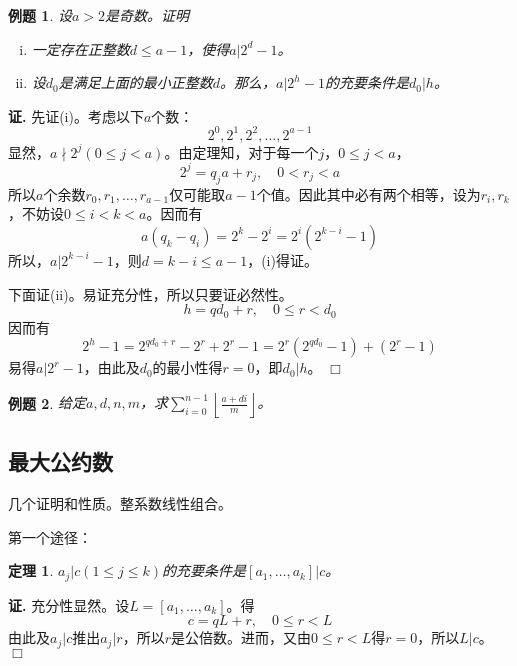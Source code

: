 \documentclass{ctexart}
\newcommand{\ffloor}[1]{{ \left\lfloor #1 \right\rfloor }}
\newtheorem{thrm}{定理}[section]
\newtheorem{exmp}{例题}[section]
\renewenvironment{proof}[1][证]{\noindent \textbf{#1.} }{\hfill$\Box$}
\begin{document}
\begin{exmp}
设$a>2$是奇数。证明
\begin{enumerate}[(i)]
\item 一定存在正整数$d \leq a-1$，使得$a|2^d-1$。
\item 设$d_0$是满足上面的最小正整数$d$。那么，$a|2^h-1$的充要条件是$d_0|h$。
\end{enumerate}
\end{exmp}
\begin{proof}
先证(i)。考虑以下$a$个数：
\begin{displaymath}
2^0,2^1,2^2,\dotsc,2^{a-1}
\end{displaymath}
显然，$a \nmid 2^j(0 \leq j <a )$。由定理知，对于每一个$j$，$0 \leq j <a$，
\begin{displaymath}
2^j=q_j a+r_j, \quad 0<r_j<a
\end{displaymath}
所以$a$个余数$r_0,r_1,\dotsc,r_{a-1}$仅可能取$a-1$个值。因此其中必有两个相等，设为$r_i,r_k$，不妨设$0\leq i<k<a$。因而有
\begin{displaymath}
a(q_k-q_i)=2^k-2^i=2^i(2^{k-i}-1)
\end{displaymath}
所以，$a|2^{k-i}-1$，则$d=k-i\leq a-1$，(i)得证。

下面证(ii)。易证充分性，所以只要证必然性。
\begin{displaymath}
h=qd_0+r, \quad 0\leq r<d_0
\end{displaymath}
因而有
\begin{displaymath}
2^h-1=2^{qd_0+r}-2^r+2^r-1=2^r(2^{qd_0}-1)+(2^r-1)
\end{displaymath}
易得$a|2^r-1$，由此及$d_0$的最小性得$r=0$，即$d_0|h$。
\end{proof}

\begin{exmp}
给定$a, d, n, m$，求$\sum_{i=0}^{n-1}\ffloor{\frac{a+di}{m}}$。
\end{exmp}


\subsection{最大公约数}
几个证明和性质。整系数线性组合。

第一个途径：
\begin{thrm}
$a_j|c(1\leq j\leq k)$的充要条件是$[a_1,\dotsc,a_k]|c$。
\end{thrm}
\begin{proof}
充分性显然。设$L=[a_1,\dotsc,a_k]$。得
\begin{displaymath}
c=qL+r,\quad 0\leq r<L
\end{displaymath}
由此及$a_j|c$推出$a_j|r$，所以$r$是公倍数。进而，又由$0\leq r<L$得$r=0$，所以$L|c$。
\end{proof}
\end{document}
